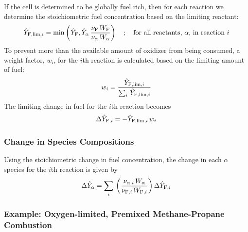 If the cell is determined to be globally fuel rich, then for each reaction we determine the stoichiometric fuel concentration based on the limiting reactant:
\begin{equation}\label{eq:stoich_fuel}
\hat{Y}_{{\rm F,lim},i} = \min \left( \hat{Y}_{\rm F}, \hat{Y}_{\alpha} \,\frac{\nu_{\rm F}\,W_{\rm F}}{\nu_{\alpha}\,W_{\alpha}} \right) \quad ; \quad \mbox{for all reactants, $\alpha$, in reaction $i$}
\end{equation}
To prevent more than the available amount of oxidizer from being consumed, a weight factor, $w_i$, for the $i$th reaction is calculated based on the limiting amount of fuel:
\begin{equation}\label{eq:fuel_weight}
w_i = \frac{\hat{Y}_{{\rm F,lim},i}}{\sum_i \, \hat{Y}_{{\rm F,lim},i}}
\end{equation}
The limiting change in fuel for the $i$th reaction becomes
\begin{equation}\label{eq:fuel_rate}
\Delta \hat{Y}_{{\rm F},i} = -\hat{Y}_{{\rm F,lim},i}\,w_i
\end{equation}

\subsubsection{Change in Species Compositions}

Using the stoichiometric change in fuel concentration, the change in each $\alpha$ species for the $i$th reaction is given by
\begin{equation}\label{eq:change_alpha}
\Delta \hat{Y}_{\alpha} = \sum_i \,\left(\frac{\nu_{\alpha,i} \,W_{\alpha}}{\nu_{{\rm F},i} \,W_{{\rm F},i}}\right)\Delta \hat{Y}_{{\rm F},i}
\end{equation}

\subsubsection{Example: Oxygen-limited, Premixed Methane-Propane Combustion}

